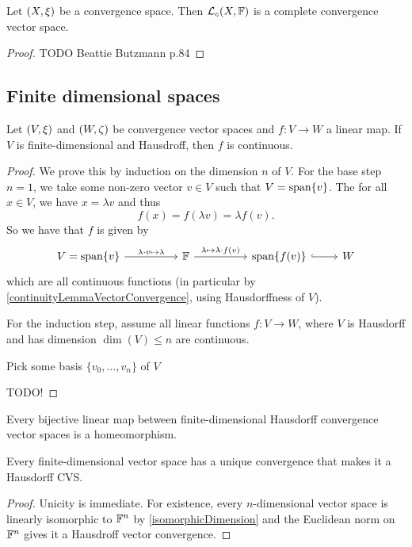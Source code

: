 \begin{proposition} \label{continuousDualComplete}
Let $\sSet{X,\xi}$ be a convergence space. Then $\operatorname{\mathcal{L}}_c(X,\mathbb{F})$ is a complete convergence vector space.
\end{proposition}
\begin{proof}
TODO Beattie Butzmann p.84
\end{proof}

\subsection{Finite dimensional spaces}
\begin{proposition} \label{finiteDimensionalLinearMapContinuous}
Let $\sSet{V,\xi}$ and $\sSet{W,\zeta}$ be convergence vector spaces and $f: V\to W$ a linear map. If $V$ is finite-dimensional and Hausdroff, then $f$ is continuous.
\end{proposition}
\begin{proof}
We prove this by induction on the dimension $n$ of $V$. For the base step $n=1$, we take some non-zero vector $v\in V$ such that $V = \operatorname{span}\{v\}$. The for all $x\in V$, we have $x= \lambda v$ and thus
\[ f(x) = f(\lambda v) = \lambda f(v). \]
So we have that $f$ is given by
\[ \begin{tikzcd}
V = \Span\{v\} \arrow[rr, "\lambda\cdot v\mapsto \lambda"] && \F \arrow[rr, "\lambda\mapsto \lambda \cdot f(v)"] && \Span\{f(v)\} \arrow[r, hook] & W
\end{tikzcd} \]
which are all continuous functions (in particular by \ref{continuityLemmaVectorConvergence}, using Hausdorffness of $V$).

For the induction step, assume all linear functions $f: V\to W$, where $V$ is Hausdorff and has dimension $\dim(V)\leq n$ are continuous.

Pick some basis $\{v_0, \ldots, v_n\}$ of $V$ 

TODO!
\end{proof}
\begin{corollary} \label{finiteDimensionalHausdorffLinearBijectionIsHomeomorphism}
Every bijective linear map between finite-dimensional Hausdorff convergence vector spaces is a homeomorphism.
\end{corollary}
\begin{corollary}
Every finite-dimensional vector space has a unique convergence that makes it a Hausdorff CVS.
\end{corollary}
\begin{proof}
Unicity is immediate. For existence, every $n$-dimensional vector space is linearly isomorphic to $\mathbb{F}^n$ by \ref{isomorphicDimension} and the Euclidean norm on $\mathbb{F}^n$ gives it a Hausdroff vector convergence. 
\end{proof}


